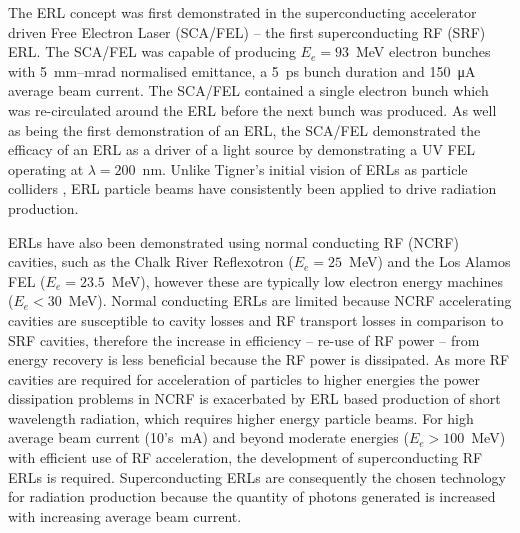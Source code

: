 \documentclass[../main.tex]{subfiles}
\begin{document}
The ERL concept was first demonstrated in the superconducting accelerator driven Free Electron Laser (SCA/FEL) \cite{smith1987development} -- the first superconducting RF (SRF) ERL. The SCA/FEL was capable of producing $E_{e} = 93$~\si{\mega\electronvolt} electron bunches with 5~\si{\milli\meter}--\si{\milli\radian} normalised emittance, a 5~\si{\pico\second} bunch duration and 150~\si{\micro\ampere} average beam current. The SCA/FEL contained a single electron bunch which was re-circulated around the ERL before the next bunch was produced. As well as being the first demonstration of an ERL, the SCA/FEL demonstrated the efficacy of an ERL as a driver of a light source by demonstrating a UV FEL operating at $\lambda = 200$~\si{\nano\meter}. Unlike Tigner's initial vision of ERLs as particle colliders \cite{tigner1965possible}, ERL particle beams have consistently been applied to drive radiation production.

ERLs have also been demonstrated using normal conducting RF (NCRF) cavities, such as the Chalk River Reflexotron ($E_{e} = 25$~\si{\mega\electronvolt}) \cite{schriber1977experimental} and the Los Alamos FEL ($E_{e} = 23.5$~\si{\mega\electronvolt})\cite{feldman1987energy}, however these are typically low electron energy machines ($E_{e} < 30$~\si{\mega\electronvolt}). Normal conducting ERLs are limited because NCRF accelerating cavities are susceptible to cavity losses and RF transport losses \cite{adolphsen2022european} in comparison to SRF cavities, therefore the increase in efficiency -- re-use of RF power -- from energy recovery is less beneficial because the RF power is dissipated. As more RF cavities are required for acceleration of particles to higher energies the power dissipation problems in NCRF is exacerbated by ERL based production of short wavelength radiation, which requires higher energy particle beams. For high average beam current (10's~\si{\milli\ampere}) and beyond moderate energies ($E_{e} > 100$~\si{\mega\electronvolt}) with efficient use of RF acceleration, the development of superconducting RF ERLs is required. Superconducting ERLs are consequently the chosen technology for radiation production because the quantity of photons generated is increased with increasing average beam current.  
\end{document}
